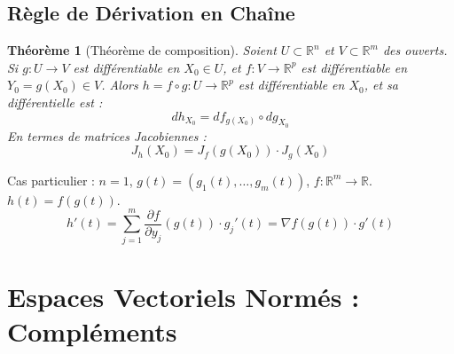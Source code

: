 \documentclass[a4paper]{article}
\newcommand{\R}{\mathbb{R}}
\newtheorem{theorem}{Théorème}[section]
\begin{document}
\subsection{Règle de Dérivation en Chaîne}
\begin{theorem}[Théorème de composition]
    Soient \(U \subset \R^n\) et \(V \subset \R^m\) des ouverts.
    Si \(g: U \to V\) est différentiable en \(X_0 \in U\), et \(f: V \to \R^p\) est différentiable en \(Y_0 = g(X_0) \in V\).
    Alors \(h = f \circ g : U \to \R^p\) est différentiable en \(X_0\), et sa différentielle est :
    \[ dh_{X_0} = df_{g(X_0)} \circ dg_{X_0} \]
    En termes de matrices Jacobiennes :
    \[ J_h(X_0) = J_f(g(X_0)) \cdot J_g(X_0) \]
\end{theorem}
Cas particulier : \(n=1\), \(g(t) = (g_1(t), \dots, g_m(t))\), \(f: \R^m \to \R\). \(h(t) = f(g(t))\).
\[ h'(t) = \sum_{j=1}^m \frac{\partial f}{\partial y_j}(g(t)) \cdot g_j'(t) = \nabla f(g(t)) \cdot g'(t) \]

\section{Espaces Vectoriels Normés : Compléments}
\end{document}
